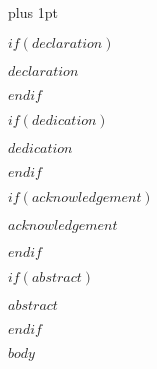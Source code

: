 \documentclass[a4paper,oneside,12pt]{templates/latex/leedsthesis}
\title{\thesistitle}
\author{\Large \thesisauthor}
\author{\thesisauthor}
\newcommand*{\bibtitle}{$bibliography-heading-in-pdf$}
\begin{document}

\renewcommand\baselinestretch{1.2}
\baselineskip=18pt plus 1pt




\maketitle
\setcounter{secnumdepth}{3}
\setcounter{tocdepth}{2}
\renewcommand\thesubsubsection{\thesubsection.\Alph{subsubsection}} 

\let\oldparagraph\paragraph
\renewcommand{\paragraph}[1]{\oldparagraph{#1}\mbox{}\\}

\frontmatter

$if(declaration)$
    \begin{declaration}
        $declaration$
    \end{declaration}
$endif$

$if(dedication)$
    \begin{dedication}
        $dedication$
    \end{dedication}
$endif$

$if(acknowledgement)$
    \begin{acknowledgement}
        $acknowledgement$
    \end{acknowledgement}
$endif$

$if(abstract)$
    \begin{abstractslong}
        $abstract$
    \end{abstractslong}
$endif$

\mainmatter

$body$

\setlength{\baselineskip}{0pt}
{\renewcommand*\MakeUppercase[1]{#1}%
\printbibliography[heading=bibintoc,title={\bibtitle}]}
\end{document}
